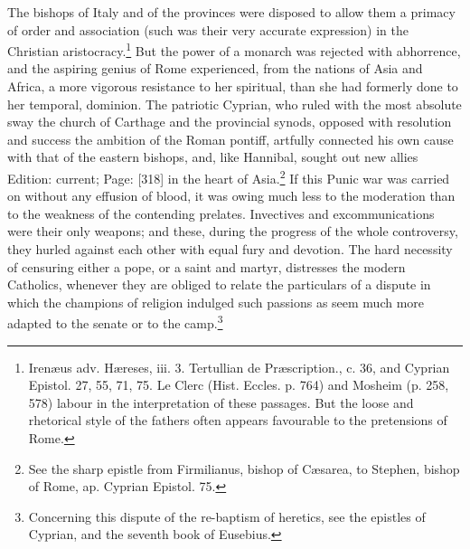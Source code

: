 The bishops of Italy and of the provinces were disposed to allow them a primacy of order and association (such was their very accurate expression) in the Christian aristocracy.\footnote{Irenæus adv. Hæreses, iii. 3. Tertullian de Præscription., c. 36, and Cyprian Epistol. 27, 55, 71, 75. Le Clerc (Hist. Eccles. p. 764) and Mosheim (p. 258, 578) labour in the interpretation of these passages. But the loose and rhetorical style of the fathers often appears favourable to the pretensions of Rome.} But the power of a monarch was rejected with abhorrence, and the aspiring genius of Rome experienced, from the nations of Asia and Africa, a more vigorous resistance to her spiritual, than she had formerly done to her temporal, dominion. The patriotic Cyprian, who ruled with the most absolute sway the church of Carthage and the provincial synods, opposed with resolution and success the ambition of the Roman pontiff, artfully connected his own cause with that of the eastern bishops, and, like Hannibal, sought out new allies Edition: current; Page: [318] in the heart of Asia.\footnote{See the sharp epistle from Firmilianus, bishop of Cæsarea, to Stephen, bishop of Rome, ap. Cyprian Epistol. 75.} If this Punic war was carried on without any effusion of blood, it was owing much less to the moderation than to the weakness of the contending prelates. Invectives and excommunications were their only weapons; and these, during the progress of the whole controversy, they hurled against each other with equal fury and devotion. The hard necessity of censuring either a pope, or a saint and martyr, distresses the modern Catholics, whenever they are obliged to relate the particulars of a dispute in which the champions of religion indulged such passions as seem much more adapted to the senate or to the camp.\footnote{Concerning this dispute of the re-baptism of heretics, see the epistles of Cyprian, and the seventh book of Eusebius.}

